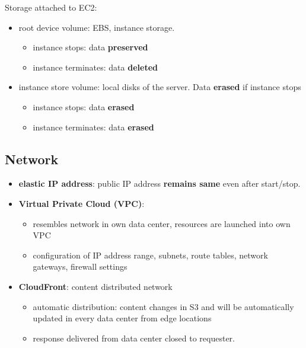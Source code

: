 Storage attached to EC2:
\begin{itemize}
	\item root device volume: EBS, instance storage. 
	\begin{itemize}
		\item instance stops: data \textbf{preserved}
		\item instance terminates: data \textbf{deleted}
	\end{itemize}
	\item instance store volume: local disks of the server. Data \textbf{erased} if instance stops
	\begin{itemize}
		\item instance stops: data \textbf{erased}
		\item instance terminates: data \textbf{erased}
	\end{itemize}
\end{itemize}

\subsection{Network}
\begin{itemize}
	\item \textbf{elastic IP address}: public IP address \textbf{remains same} even after start/stop.
	\item \textbf{Virtual Private Cloud (VPC)}: 
	\begin{itemize}
		\item resembles network in own data center, resources are launched into own VPC
		\item configuration of IP address range, subnets, route tables, network gateways, firewall settings	
	\end{itemize}
	\item \textbf{CloudFront}: content distributed network
	\begin{itemize}
		\item automatic distribution: content changes in S3 and will be automatically updated in every data center from edge locations
		\item response delivered from data center closed to requester.
	\end{itemize}
\end{itemize}


